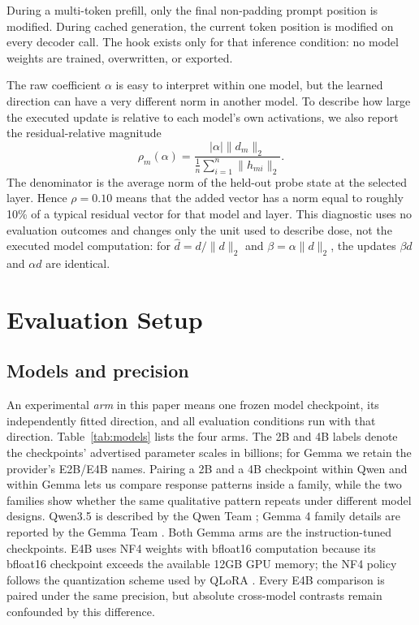 \documentclass[11pt]{article}
\begin{document}
During a multi-token prefill, only the final non-padding prompt position is
modified. During cached generation, the current token position is modified on
every decoder call. The hook exists only for that inference condition: no model
weights are trained, overwritten, or exported.

The raw coefficient $\alpha$ is easy to interpret within one model, but the
learned direction can have a very different norm in another model. To describe
how large the executed update is relative to each model's own activations, we
also report the residual-relative magnitude
\begin{equation}
  \rho_m(\alpha)=
  \frac{|\alpha|\lVert d_m\rVert_2}
       {\frac{1}{n}\sum_{i=1}^{n}\lVert h_{mi}\rVert_2}.
  \label{eq:relative-dose}
\end{equation}
The denominator is the average norm of the held-out probe state at the selected
layer. Hence $\rho=0.10$ means that the added vector has a norm equal to roughly
10\% of a typical residual vector for that model and layer. This diagnostic uses
no evaluation outcomes and changes only the unit used to describe dose, not the
executed model computation: for
$\widehat d=d/\lVert d\rVert_2$ and
$\beta=\alpha\lVert d\rVert_2$, the updates
$\beta\widehat d$ and $\alpha d$ are identical.

\section{Evaluation Setup}
\label{sec:evaluation-setup}

\subsection{Models and precision}

An experimental \emph{arm} in this paper means one frozen model checkpoint,
its independently fitted direction, and all evaluation conditions run with
that direction. Table~\ref{tab:models} lists the four arms. The 2B and 4B labels
denote the checkpoints' advertised parameter scales in billions; for Gemma we
retain the provider's E2B/E4B names. Pairing a 2B and a
4B checkpoint within Qwen and within Gemma lets us compare response patterns
inside a family, while the two families show whether the same qualitative
pattern repeats under different model designs. Qwen3.5 is
described by the Qwen Team \citep{qwen2026qwen35}; Gemma 4 family details are
reported by the Gemma Team \citep{gemmateam2026gemma4}. Both Gemma arms are the
instruction-tuned checkpoints. E4B uses NF4 weights with bfloat16 computation
because its bfloat16 checkpoint exceeds the available 12GB GPU memory; the NF4
policy follows the quantization scheme used by QLoRA
\citep{dettmers2023qlora}. Every E4B comparison is paired under the same
precision, but absolute cross-model contrasts remain confounded by this
difference.
\end{document}
